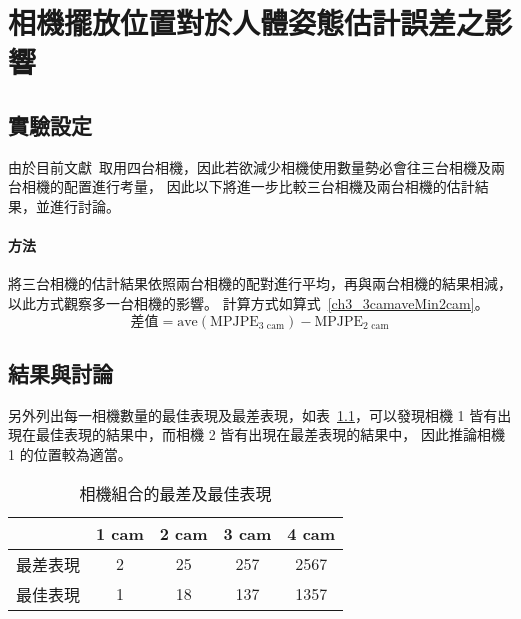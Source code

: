 \chapter{相機擺放位置對於人體姿態估計誤差之影響}
\fontsize{12pt}{18pt}\selectfont


\section{實驗設定}
由於目前文獻~\cite{Zhang_2020_CVPR}取用四台相機，因此若欲減少相機使用數量勢必會往三台相機及兩台相機的配置進行考量，
因此以下將進一步比較三台相機及兩台相機的估計結果，並進行討論。

\subsubsection*{方法}
將三台相機的估計結果依照兩台相機的配對進行平均，再與兩台相機的結果相減，以此方式觀察多一台相機的影響。
計算方式如算式~\ref{ch3_3camaveMin2cam}。
\begin{equation}
   \label{ch3_3camaveMin2cam}
   \text{差值} = \text{ave}(\text{MPJPE}_{3 \text{ cam}})-\text{MPJPE}_{2 \text{ cam}}
\end{equation}

\section{結果與討論}
另外列出每一相機數量的最佳表現及最差表現，如表~\ref{ch3_best_worst_camset}，可以發現相機 1 皆有出現在最佳表現的結果中，而相機 2 皆有出現在最差表現的結果中，
因此推論相機 1 的位置較為適當。
\begin{table}[!ht]
   \caption[相機組合的最差及最佳表現]{相機組合的最差及最佳表現}
   \centering
   \label{ch3_best_worst_camset}
   \setlength{\tabcolsep}{3pt}
   \renewcommand\arraystretch{1.5}
   \begin{tabular}{c|c|c|c|c}
       & 1 cam & 2 cam & 3 cam & 4 cam \\ 
      \midrule[2pt]
      最差表現 & 2 & 25 & 257 & 2567 \\
      最佳表現 & 1 & 18 & 137 & 1357 \\
   \end{tabular}
\end{table}

